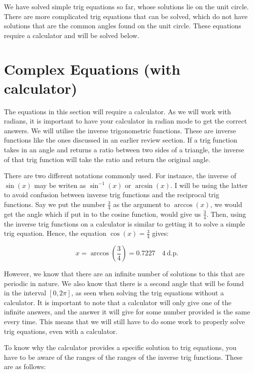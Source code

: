 \documentclass[12pt]{article}
\theoremstyle{definition}
\begin{document}
We have solved simple trig equations so far, whose solutions lie on the unit circle.
There are more complicated trig equations that can be solved, which do not have solutions that are the common angles found on the unit circle.
These equations require a calculator and will be solved below.

\section{Complex Equations (with calculator)}

The equations in this section will require a calculator.
As we will work with radians, it is important to have your calculator in radian mode to get the correct answers.
We will utilise the inverse trigonometric functions.
These are inverse functions like the ones discussed in an earlier review section.
If a trig function takes in an angle and returns a ratio between two sides of a triangle, the inverse of that trig function will take the ratio and return the original angle.

There are two different notations commonly used.
For instance, the inverse of $\sin(x)$ may be writen as $\sin^{-1}(x)$ or $\arcsin(x)$.
I will be using the latter to avoid confusion between inverse trig functions and the reciprocal trig functions.
Say we put the number $\frac{3}{4}$ as the argument to $\arccos(x)$, we would get the angle which if put in to the cosine function, would give us $\frac{3}{4}$.
Then, using the inverse trig functions on a calculator is similar to getting it to solve a simple trig equation.
Hence, the equation $\cos(x) = \frac{3}{4}$ gives:

\begin{equation}
    x = \arccos\left(\frac{3}{4}\right) = 0.7227 \quad 4~\text{d.p.}
\end{equation}

However, we know that there are an infinite number of solutions to this that are periodic in nature.
We also know that there is a second angle that will be found in the interval $[0, 2\pi]$, as seen when solving the trig equations without a calculator.
It is important to note that a calculator will only give one of the infinite answers, and the answer it will give for some number provided is the same every time.
This means that we will still have to do some work to properly solve trig equations, even with a calculator.

To know why the calculator provides a specific solution to trig equations, you have to be aware of the ranges of the ranges of the inverse trig functions.
These are as follows:
\end{document}
